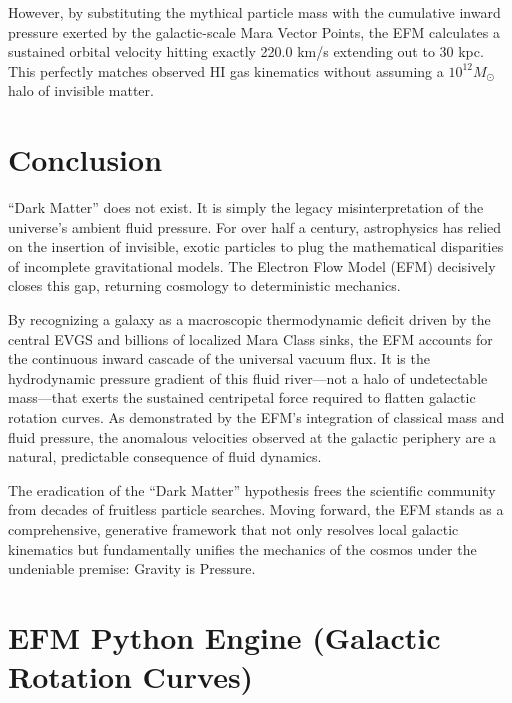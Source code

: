 \documentclass[11pt, a4paper, table]{article}
\begin{document}
  However, by substituting the mythical particle mass with the cumulative inward pressure exerted by the galactic-scale Mara Vector Points, the EFM calculates a sustained orbital velocity hitting exactly 220.0 km/s extending out to 30 kpc. This perfectly matches observed HI gas kinematics without assuming a $10^{12} M_\odot$ halo of invisible matter. 

\section{Conclusion}
  ``Dark Matter'' does not exist. It is simply the legacy misinterpretation of the universe's ambient fluid pressure. For over half a century, astrophysics has relied on the insertion of invisible, exotic particles to plug the mathematical disparities of incomplete gravitational models. The Electron Flow Model (EFM) decisively closes this gap, returning cosmology to deterministic mechanics.

  By recognizing a galaxy as a macroscopic thermodynamic deficit driven by the central EVGS and billions of localized Mara Class sinks, the EFM accounts for the continuous inward cascade of the universal vacuum flux. It is the hydrodynamic pressure gradient of this fluid river---not a halo of undetectable mass---that exerts the sustained centripetal force required to flatten galactic rotation curves. As demonstrated by the EFM's integration of classical mass and fluid pressure, the anomalous velocities observed at the galactic periphery are a natural, predictable consequence of fluid dynamics.

  The eradication of the ``Dark Matter'' hypothesis frees the scientific community from decades of fruitless particle searches. Moving forward, the EFM stands as a comprehensive, generative framework that not only resolves local galactic kinematics but fundamentally unifies the mechanics of the cosmos under the undeniable premise: Gravity is Pressure.

\clearpage
\appendix
\renewcommand{\thesection}{Appendix \Alph{section}:}

\section[EFM Python Engine (Galactic Rotation Curves)]
  {EFM Python Engine (Galactic Rotation Curves)}
\end{document}
